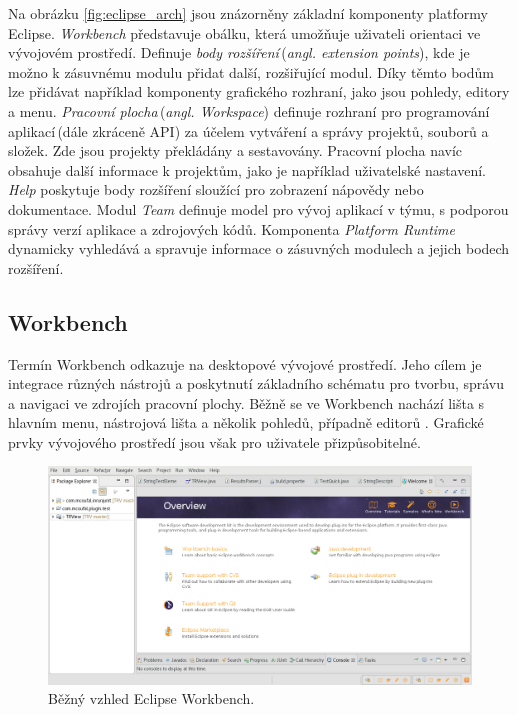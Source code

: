   Na obrázku \ref{fig:eclipse_arch} jsou znázorněny základní komponenty platformy Eclipse. \emph{Workbench} představuje obálku, která umožňuje uživateli orientaci ve vývojovém prostředí. Definuje \emph{body rozšíření}\,(\emph{angl. extension points}), kde je možno k zásuvnému modulu přidat další, rozšiřující modul. Díky těmto bodům lze přidávat například komponenty grafického rozhraní, jako jsou pohledy, editory a menu. \emph{Pracovní plocha}\,(\emph{angl. Workspace}) definuje rozhraní pro programování aplikací\,(dále zkráceně API) za účelem vytváření a správy projektů, souborů a složek. Zde jsou projekty překládány a sestavovány. Pracovní plocha navíc obsahuje další informace k projektům, jako je například uživatelské nastavení. \emph{Help} poskytuje body rozšíření sloužící pro zobrazení nápovědy nebo dokumentace. Modul \emph{Team} definuje model pro vývoj aplikací v týmu, s podporou správy verzí aplikace a zdrojových kódů. Komponenta \emph{Platform Runtime} dynamicky vyhledává a spravuje informace o zásuvných modulech a jejich bodech rozšíření. 

    \subsection{Workbench}
    Termín Workbench odkazuje na desktopové vývojové prostředí. Jeho cílem je integrace různých nástrojů a poskytnutí základního schématu pro tvorbu, správu a navigaci ve zdrojích pracovní plochy. Běžně se ve Workbench nachází lišta s hlavním menu, nástrojová lišta a několik pohledů, případně editorů \cite{eclipse-workbench}. Grafické prvky vývojového prostředí jsou však pro uživatele přizpůsobitelné.

    \begin{figure}[h]
      \includegraphics[width=\textwidth, keepaspectratio, center]{obrazky-figures/eclipse_workbench.png}
      \caption{Běžný vzhled Eclipse Workbench.}
      \label{fig:eclipse_workbench}
    \end{figure}

